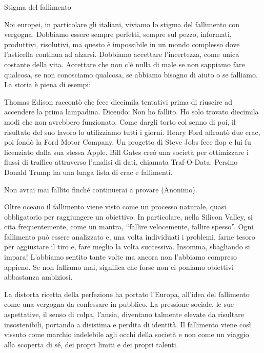 \documentclass[12pt]{book} %
\begin{document}
\bigskip
\begin{mdframed}[linewidth=1pt]
Stigma del fallimento

Noi europei, in particolare gli italiani, viviamo lo stigma del fallimento con vergogna. Dobbiamo essere sempre
perfetti, sempre sul pezzo, informati, produttivi, risolutivi, ma questo è impossibile in un mondo complesso dove
l'asticella continua ad alzarsi. Dobbiamo accettare l'incertezza, come unica
costante della vita. Accettare che non c'è nulla di male se non sappiamo fare qualcosa, se non
conosciamo qualcosa, se abbiamo bisogno di aiuto o se falliamo. La storia è piena di esempi:

Thomas Edison raccontò che fece diecimila tentativi prima di riuscire ad accendere la prima lampadina. Dicendo: Non ho
fallito. Ho solo trovato diecimila modi che non avrebbero funzionato. Come dargli torto col senno di poi, il risultato
del suo lavoro lo utilizziamo tutti i giorni. Henry Ford affrontò due crac, poi fondò la Ford Motor Company. Un
progetto di Steve Jobs fece flop e lui fu licenziato dalla sua stessa Apple. Bill Gates creò una società per
ottimizzare i flussi di traffico attraverso l'analisi di dati, chiamata Traf-O-Data. Persino
Donald Trump ha una lunga lista di crac e
fallimenti.


\bigskip

Non avrai mai fallito finché continuerai a provare (Anonimo).


\bigskip

Oltre oceano il fallimento viene visto come un processo naturale, quasi obbligatorio per raggiungere un obiettivo. In
particolare, nella Silicon Valley, si cita frequentemente, come un mantra, “fallire velocemente, fallire spesso”. Ogni
fallimento può essere analizzato e, una volta individuati i problemi, farne tesoro per aggiustare il tiro e, fare
meglio la volta successiva. Insomma, sbagliando si impara! L'abbiamo sentito tante volte ma ancora
non l'abbiamo compreso appieno. Se non falliamo mai, significa che forse non ci poniamo obiettivi abbastanza ambiziosi.


\bigskip

La distorta ricetta della perfezione ha portato l'Europa, all'idea del
fallimento come una vergogna da confessare in pubblico. La pressione sociale, le sue aspettative, il senso di colpa,
l'ansia, diventano talmente elevate da risultare insostenibili, portando a disistima e perdita di
identità. Il fallimento viene così vissuto come marchio indelebile agli occhi della società e non come un viaggio alla
scoperta di sé, dei propri limiti e dei propri talenti.


\end{mdframed}
\end{document}
